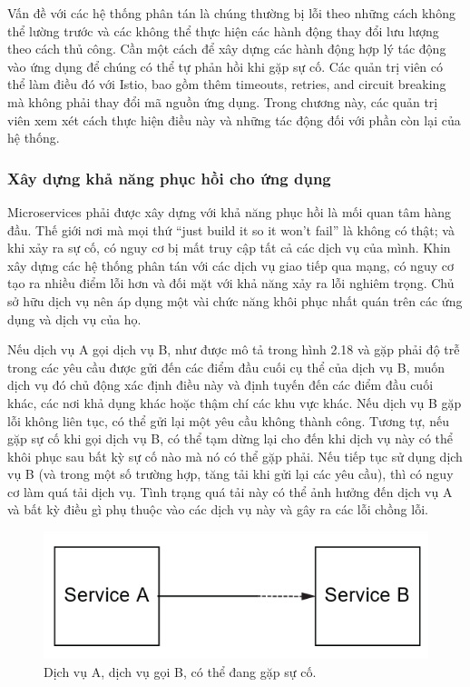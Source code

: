 \documentclass[12pt,a4paper]{report}
\begin{document}
Vấn đề với các hệ thống phân tán là chúng thường bị lỗi theo những cách không thể lường trước và các không thể thực hiện các hành động thay đổi lưu lượng theo cách thủ công. Cần một cách để xây dựng các hành động hợp lý tác động vào ứng dụng để chúng có thể tự phản hồi khi gặp sự cố. Các quản trị viên có thể làm điều đó với Istio, bao gồm thêm timeouts, retries, and circuit breaking mà không phải thay đổi mã nguồn ứng dụng. Trong chương này, các quản trị viên xem xét cách thực hiện điều này và những tác động đối với phần còn lại của hệ thống.
			\subsubsection{Xây dựng khả năng phục hồi cho ứng dụng}
\hspace{0.6cm}Microservices phải được xây dựng với khả năng phục hồi là mối quan tâm hàng đầu. Thế giới nơi mà mọi thứ “just build it so it won’t fail” là không có thật; và khi xảy ra sự cố, có nguy cơ bị mất truy cập tất cả các dịch vụ của mình. Khin xây dựng các hệ thống phân tán với các dịch vụ giao tiếp qua mạng, có nguy cơ tạo ra nhiều điểm lỗi hơn và đối mặt với khả năng xảy ra lỗi nghiêm trọng. Chủ sở hữu dịch vụ nên áp dụng một vài chức năng khôi phục nhất quán trên các ứng dụng và dịch vụ của họ.

Nếu dịch vụ A gọi dịch vụ B, như được mô tả trong hình 2.18 và gặp phải độ trễ trong các yêu cầu được gửi đến các điểm đầu cuối cụ thể của dịch vụ B, muốn dịch vụ đó chủ động xác định điều này và định tuyến đến các điểm đầu cuối khác, các nơi khả dụng khác hoặc thậm chí các khu vực khác. Nếu dịch vụ B gặp lỗi không liên tục, có thể gửi lại một yêu cầu không thành công. Tương tự, nếu gặp sự cố khi gọi dịch vụ B, có thể tạm dừng lại cho đến khi dịch vụ này có thể khôi phục sau bất kỳ sự cố nào mà nó có thể gặp phải. Nếu tiếp tục sử dụng dịch vụ B (và trong một số trường hợp, tăng tải khi gửi lại các yêu cầu), thì có nguy cơ làm quá tải dịch vụ. Tình trạng quá tải này có thể ảnh hưởng đến dịch vụ A và bất kỳ điều gì phụ thuộc vào các dịch vụ này và gây ra các lỗi chồng lỗi.
\begin{figure}[h]
	\centering
	\includegraphics[width=0.7\linewidth]{Pics/2.2.3-p1}
	\caption{Dịch vụ A, dịch vụ gọi B, có thể đang gặp sự cố.}
	\label{fig:2.2.3-1}
\end{figure}
\end{document}
